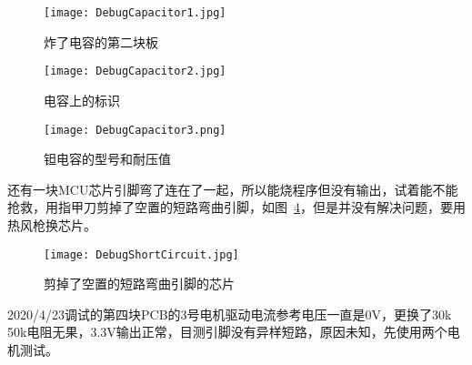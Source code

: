\begin{figure}[htbp]
    \centering
    \texttt{[image: DebugCapacitor1.jpg]}
    \caption{炸了电容的第二块板}
    \label{fig:DebugCapacitor1}
\end{figure}

\begin{figure}[htbp]
    \centering
    \texttt{[image: DebugCapacitor2.jpg]}
    \caption{电容上的标识}
    \label{fig:DebugCapacitor2}
\end{figure}

\begin{figure}[htbp]
    \centering
    \texttt{[image: DebugCapacitor3.png]}
    \caption{钽电容的型号和耐压值}
    \label{fig:DebugCapacitor3}
\end{figure}

还有一块MCU芯片引脚弯了连在了一起，所以能烧程序但没有输出，试着能不能抢救，用指甲刀剪掉了空置的短路弯曲引脚，如图~\ref{fig:DebugShortCircuit}，但是并没有解决问题，要用热风枪换芯片。

\begin{figure}[htbp]
    \centering
    \texttt{[image: DebugShortCircuit.jpg]}
    \caption{剪掉了空置的短路弯曲引脚的芯片}
    \label{fig:DebugShortCircuit}
\end{figure}

2020/4/23调试的第四块PCB的3号电机驱动电流参考电压一直是0V，更换了30k 50k电阻无果，3.3V输出正常，目测引脚没有异样短路，原因未知，先使用两个电机测试。